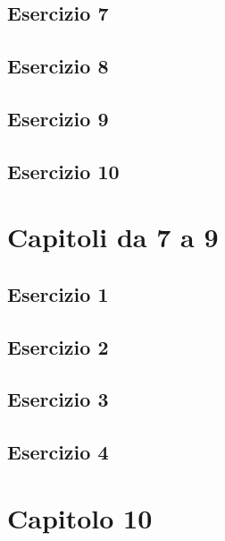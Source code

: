 \documentclass[a4paper,12pt,oneside]{book}
\begin{document}
\hypertarget{esercizio-7-1}{%
\subsection{Esercizio 7}\label{esercizio-7-1}}

\hypertarget{esercizio-8-1}{%
\subsection{Esercizio 8}\label{esercizio-8-1}}

\hypertarget{esercizio-9}{%
\subsection{Esercizio 9}\label{esercizio-9}}

\hypertarget{esercizio-10}{%
\subsection{Esercizio 10}\label{esercizio-10}}

\hypertarget{capitoli-da-7-a-9}{%
\section{Capitoli da 7 a 9}\label{capitoli-da-7-a-9}}

\hypertarget{esercizio-1-5}{%
\subsection{Esercizio 1}\label{esercizio-1-5}}

\hypertarget{esercizio-2-4}{%
\subsection{Esercizio 2}\label{esercizio-2-4}}

\hypertarget{esercizio-3-4}{%
\subsection{Esercizio 3}\label{esercizio-3-4}}

\hypertarget{esercizio-4-3}{%
\subsection{Esercizio 4}\label{esercizio-4-3}}

\hypertarget{capitolo-10}{%
\section{Capitolo 10}\label{capitolo-10}}
\end{document}
